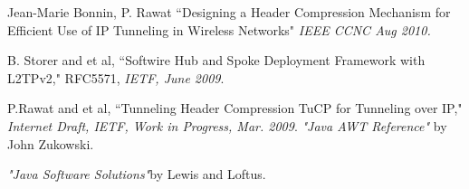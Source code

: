 
\begin{thebibliography}{99}

Jean-Marie Bonnin, P. Rawat ``Designing a Header Compression Mechanism for Efficient Use of IP Tunneling in Wireless Networks" \emph{IEEE CCNC Aug 2010.}

	B. Storer and et al, ``Softwire Hub and Spoke Deployment Framework with L2TPv2," RFC5571, \emph{IETF, June 2009}.

  P.Rawat and et al, ``Tunneling Header Compression TuCP for Tunneling over IP," \emph{Internet Draft, IETF, Work in Progress, Mar. 2009}.
{\it "Java AWT Reference"} by John Zukowski.

 {\it "Java Software Solutions"}by Lewis and Loftus.
\end{thebibliography}

